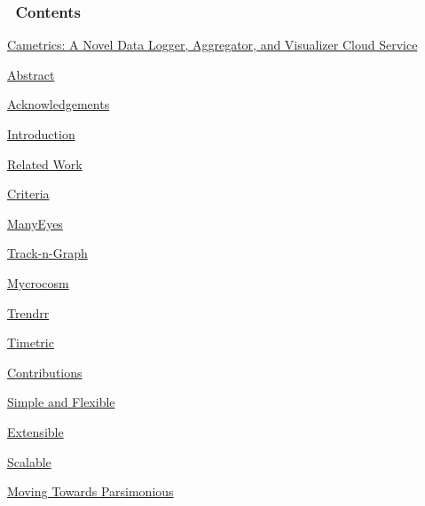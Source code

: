 \documentclass[10pt,a4paper,english]{article}
\begin{document}
\subsubsection*{~\hfill Contents\hfill ~}
\label{contents}
\begin{list}{}{}
\item {} \href{\#cametrics-a-novel-data-logger-aggregator-and-visualizer-cloud-service}{Cametrics: A Novel Data Logger, Aggregator, and Visualizer Cloud Service}

\item {} \href{\#abstract}{Abstract}

\item {} \href{\#acknowledgements}{Acknowledgements}

\item {} \href{\#introduction}{Introduction}

\item {} \href{\#related-work}{Related Work}
\begin{list}{}{}
\item {} \href{\#criteria}{Criteria}

\item {} \href{\#manyeyes}{ManyEyes}

\item {} \href{\#track-n-graph}{Track-n-Graph}

\item {} \href{\#mycrocosm}{Mycrocosm}

\item {} \href{\#trendrr}{Trendrr}

\item {} \href{\#timetric}{Timetric}

\end{list}

\item {} \href{\#contributions}{Contributions}
\begin{list}{}{}
\item {} \href{\#simple-and-flexible}{Simple and Flexible}

\item {} \href{\#extensible}{Extensible}

\item {} \href{\#scalable}{Scalable}

\item {} \href{\#moving-towards-parsimonious}{Moving Towards Parsimonious}

\end{list}


\end{list}
\end{document}
